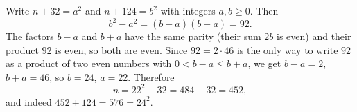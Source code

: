 Write $n+32=a^2$ and $n+124=b^2$ with integers $a,b\ge0$. Then
\[
b^2-a^2=(b-a)(b+a)=92 .
\]
The factors $b-a$ and $b+a$ have the same parity (their sum $2b$ is even) and their product $92$ is even, so both are even. Since $92=2\cdot46$ is the only way to write $92$ as a product of two even numbers with $0<b-a\le b+a$, we get $b-a=2$, $b+a=46$, so $b=24$, $a=22$. Therefore
\[
n=22^2-32=484-32=\boxed{452},
\]
and indeed $452+124=576=24^2$.
